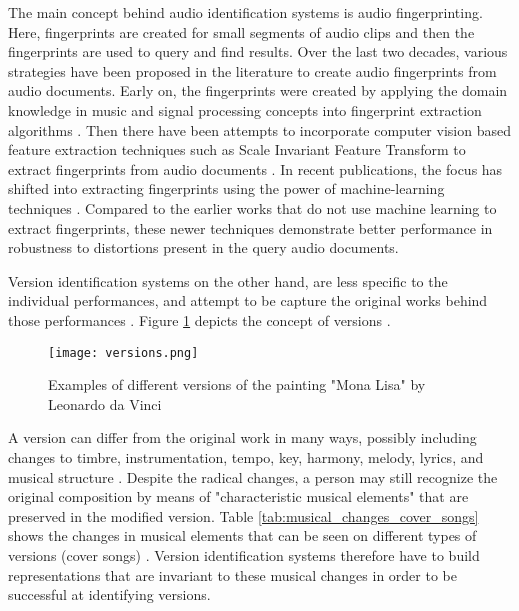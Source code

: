 \documentclass[../main.tex]{subfiles}
\begin{document}
\par
The main concept behind audio identification systems is audio fingerprinting. Here, fingerprints are created for small segments of audio clips and then the fingerprints are  used to query and find results. Over the last two decades, various strategies have been proposed in the literature to create audio fingerprints from audio documents. Early on, the fingerprints were created by applying the domain knowledge in music and signal processing concepts into fingerprint extraction algorithms  \cite{haitsmaHighlyRobustAudio2002,wangIndustrialStrengthAudio2003,ellisEchoPrintOpenSource2011,miroMASKRobustLocal2012,sixPanakoScalableAcoustic2014}. Then there have been attempts to incorporate computer vision based feature extraction techniques such as Scale Invariant Feature Transform to extract fingerprints from audio documents \cite{computer_vision_for_music_identification,sift}. In recent publications, the focus has shifted into extracting fingerprints using the power of machine-learning techniques \cite{arcas_now_2017,baez_suarez_unsupervised_2020,yu_contrastive_2020}. Compared to the earlier works that do not use machine learning to extract fingerprints, these newer techniques demonstrate better performance in robustness to distortions present in the query audio documents. 
\\
\par
Version identification systems on the other hand, are less specific to the individual performances, and attempt to be capture the original works behind those performances \cite{serraAudioCoverSong2010}. Figure \ref{fig:versions} depicts the concept of versions \cite{book}.
\begin{figure}[H]
    \centering
    \texttt{[image: versions.png]}
    \caption{Examples of different versions of the painting "Mona Lisa" by Leonardo da Vinci}
    \label{fig:versions}
\end{figure}

\par
A version can differ from the original work in many ways, possibly including changes to timbre, instrumentation, tempo, key, harmony, melody, lyrics, and musical structure \cite{book}. Despite the radical changes, a person may still recognize the original composition by means of "characteristic musical elements" that are preserved in the modified version. Table \ref{tab:musical_changes_cover_songs} shows the changes in musical elements that can be seen on different types of versions (cover songs) \cite{serraAudioCoverSong2010}. Version identification systems therefore have to build representations that are invariant to these musical changes in order to be successful at identifying versions.
\end{document}
